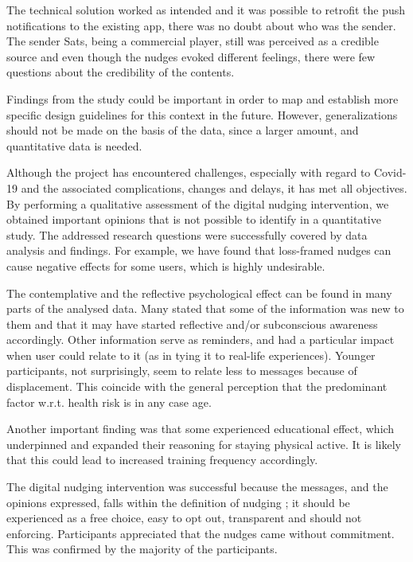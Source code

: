 The technical solution worked as intended and it was possible to retrofit the push notifications to the existing app, there was no doubt about who was the sender. The sender Sats, being a commercial player, still was perceived as a credible source and even though the nudges evoked different feelings, there were few questions about the credibility of the contents.

Findings from the study could be important in order to map and establish more specific design guidelines for this context in the future. However, generalizations should not be made on the basis of the data, since a larger amount, and quantitative data is needed.

Although the project has encountered challenges, especially with regard to Covid-19 and the associated complications, changes and delays, it has met all objectives. By performing a qualitative assessment of the digital nudging intervention, we obtained important opinions that is not possible to identify in a quantitative study. The addressed research questions were successfully covered by data analysis and findings. For example, we have found that loss-framed nudges can cause negative effects for some users, which is highly undesirable. 

The contemplative and the reflective psychological effect can be found in many parts of the analysed data. Many stated that some of the information was new to them and that it may have started reflective and/or subconscious awareness accordingly. Other information serve as reminders, and had a particular impact when user could relate to it (as in tying it to real-life experiences). Younger participants, not surprisingly, seem to relate less to messages because of displacement. This coincide with the general perception that the predominant factor w.r.t. health risk is in any case age. 

Another important finding was that some experienced educational effect, which underpinned and expanded their reasoning for staying physical active. It is likely that this could lead to increased training frequency accordingly. 


The digital nudging intervention was successful because the messages, and the opinions expressed, falls within the definition of nudging ; it should be experienced as a free choice, easy to opt out, transparent and should not enforcing. Participants appreciated that the nudges came without commitment. This was confirmed by the majority of the participants. 


